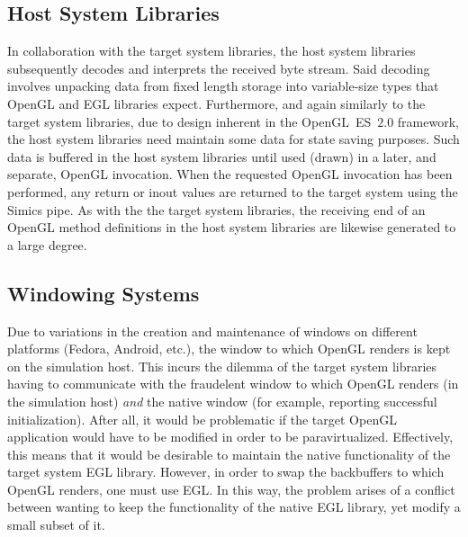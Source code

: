 \subsection{Host System Libraries}
\label{sec:proposedsolutionandimplementation_hostsystemlibraries}
In collaboration with the target system libraries, the host system libraries subsequently decodes and interprets the received byte stream.
Said decoding involves unpacking data from fixed length storage into variable-size types that OpenGL and EGL libraries expect.
Furthermore, and again similarly to the target system libraries, due to design inherent in the OpenGL~ES~$2.0$ framework, the host system libraries need maintain some data for state saving purposes.
Such data is buffered in the host system libraries until used (drawn) in a later, and separate, OpenGL invocation.
When the requested OpenGL invocation has been performed, any return or inout values are returned to the target system using the Simics pipe.
As with the the target system libraries, the receiving end of an OpenGL method definitions in the host system libraries are likewise generated to a large degree.

\subsection{Windowing Systems}
\label{sec:proposedsolutionandimplementation_windowingsystems}
Due to variations in the creation and maintenance of windows on different platforms (Fedora, Android, etc.), the window to which OpenGL renders is kept on the simulation host.
This incurs the dilemma of the target system libraries having to communicate with the fraudelent window to which OpenGL renders (in the simulation host) \textit{and} the native window (for example, reporting successful initialization).
After all, it would be problematic if the target OpenGL application would have to be modified in order to be paravirtualized.
Effectively, this means that it would be desirable to maintain the native functionality of the target system EGL library.
However, in order to swap the backbuffers to which OpenGL renders, one must use EGL.
In this way, the problem arises of a conflict between wanting to keep the functionality of the native EGL library, yet modify a small subset of it.
 
